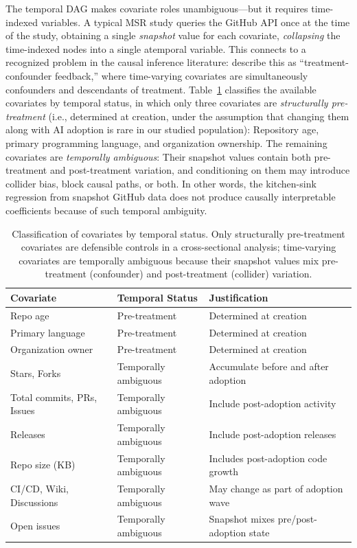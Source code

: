 The temporal DAG makes covariate roles unambiguous---but it requires time-indexed variables.
A typical MSR study queries the GitHub API once at the time of the study, obtaining a single \emph{snapshot} value for each covariate, \emph{collapsing} the time-indexed nodes into a single atemporal variable.
This connects to a recognized problem in the causal inference literature: \citet[Ch.~20]{hernan2020causal} describe this as ``treatment-confounder feedback,'' where time-varying covariates are simultaneously confounders and descendants of treatment.
Table~\ref{tab:covariate-classification} classifies the available covariates by temporal status, in which only three covariates are \emph{structurally pre-treatment} (i.e., determined at creation, under the assumption that changing them along with AI adoption is rare in our studied population): Repository age, primary programming language, and organization ownership.
The remaining covariates are \emph{temporally ambiguous}: Their snapshot values contain both pre-treatment and post-treatment variation, and conditioning on them may introduce collider bias, block causal paths, or both.
In other words, the kitchen-sink regression from snapshot GitHub data does not produce causally interpretable coefficients because of such temporal ambiguity.

\begin{table}[t]
\centering
\caption{Classification of covariates by temporal status.
Only structurally pre-treatment covariates are defensible controls in a cross-sectional analysis; time-varying covariates are temporally ambiguous because their snapshot values mix pre-treatment (confounder) and post-treatment (collider) variation.}
\label{tab:covariate-classification}
\small
\begin{tabular}{lll}
\toprule
Covariate & Temporal Status & Justification \\
\midrule
Repo age & Pre-treatment & Determined at creation \\
Primary language & Pre-treatment & Determined at creation \\
Organization owner & Pre-treatment & Determined at creation \\
\midrule
Stars, Forks & Temporally ambiguous & Accumulate before and after adoption \\
Total commits, PRs, Issues & Temporally ambiguous & Include post-adoption activity \\
Releases & Temporally ambiguous & Include post-adoption releases \\
Repo size (KB) & Temporally ambiguous & Includes post-adoption code growth \\
CI/CD, Wiki, Discussions & Temporally ambiguous & May change as part of adoption wave \\
Open issues & Temporally ambiguous & Snapshot mixes pre/post-adoption state \\
\bottomrule
\end{tabular}
\end{table}

